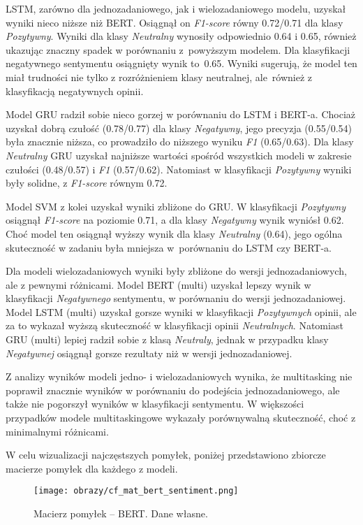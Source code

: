 LSTM, zarówno dla jednozadaniowego, jak i wielozadaniowego modelu, uzyskał wyniki nieco niższe niż BERT. Osiągnął on \textit{F1-score} równy 0.72/0.71 dla klasy \textit{Pozytywny}. Wyniki dla klasy \textit{Neutralny} wynosiły odpowiednio 0.64 i 0.65, również ukazując znaczny spadek w porównaniu z~powyższym modelem. Dla klasyfikacji negatywnego sentymentu osiągnięty wynik to~0.65. Wyniki sugerują, że model ten miał trudności nie tylko z rozróżnieniem klasy neutralnej, ale~również z klasyfikacją negatywnych opinii.

\newpage
Model GRU radził sobie nieco gorzej w porównaniu do LSTM i BERT-a. Chociaż uzyskał dobrą czułość (0.78/0.77) dla klasy \textit{Negatywny}, jego precyzja (0.55/0.54) była znacznie niższa, co prowadziło do niższego wyniku \textit{F1} (0.65/0.63). Dla klasy \textit{Neutralny} GRU uzyskał najniższe wartości spośród wszystkich modeli w zakresie czułości (0.48/0.57) i \textit{F1} (0.57/0.62). Natomiast w klasyfikacji \textit{Pozytywny} wyniki były solidne, z \textit{F1-score} równym 0.72.

Model SVM z kolei uzyskał wyniki zbliżone do GRU. W klasyfikacji \textit{Pozytywny} osiągnął \textit{F1-score} na poziomie 0.71, a dla klasy \textit{Negatywny} wynik wyniósł 0.62. Choć model ten osiągnął wyższy wynik dla klasy \textit{Neutralny} (0.64), jego ogólna skuteczność w zadaniu była mniejsza w~porównaniu do LSTM czy BERT-a.

Dla modeli wielozadaniowych wyniki były zbliżone do wersji jednozadaniowych, ale z pewnymi różnicami. Model BERT (multi) uzyskał lepszy wynik w klasyfikacji \textit{Negatywnego} sentymentu, w porównaniu do wersji jednozadaniowej. Model LSTM (multi) uzyskał gorsze wyniki w klasyfikacji \textit{Pozytywnych} opinii, ale za to wykazał wyższą skuteczność w klasyfikacji opinii \textit{Neutralnych}. Natomiast GRU (multi) lepiej radził sobie z klasą \textit{Neutraly}, jednak w przypadku klasy \textit{Negatywnej} osiągnął gorsze rezultaty niż w wersji jednozadaniowej.

Z analizy wyników modeli jedno- i wielozadaniowych wynika, że multitasking nie poprawił znacznie wyników w porównaniu do podejścia jednozadaniowego, ale także nie pogorszył wyników w klasyfikacji sentymentu. W większości przypadków modele multitaskingowe wykazały porównywalną skuteczność, choć z minimalnymi różnicami.

\raggedbottom
\vspace{15pt}
W celu wizualizacji najczęstszych pomyłek, poniżej przedstawiono zbiorcze macierze pomyłek dla każdego z modeli.
\begin{figure}[H]
    \centering
    \texttt{[image: obrazy/cf\_mat\_bert\_sentiment.png]}
    \caption{Macierz pomyłek -- BERT. Dane własne.}
    \label{fig:cf_bert_sentiment}
\end{figure}

